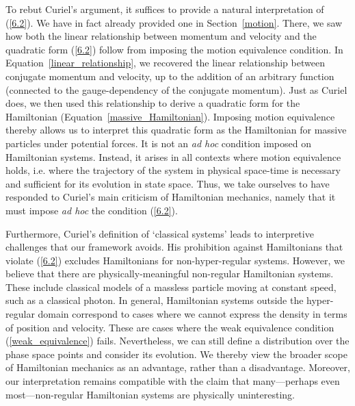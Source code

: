 \documentclass[12pt, english, twoside]{article} %
\begin{document}
To rebut Curiel's argument, it suffices to provide a natural interpretation of (\ref{6.2}). We have in fact already provided one in Section~\ref{motion}. There, we saw how both the linear relationship between momentum and velocity and the quadratic form (\ref{6.2}) follow from imposing the motion equivalence condition. In Equation~\ref{linear_relationship}, we recovered the linear relationship between conjugate momentum and velocity, up to the addition of an arbitrary function (connected to the gauge-dependency of the conjugate momentum). Just as Curiel does, we then used this relationship to derive a quadratic form for the Hamiltonian (Equation~\ref{massive_Hamiltonian}). Imposing motion equivalence thereby allows us to interpret this quadratic form as the Hamiltonian for massive particles under potential forces. It is not an \textit{ad hoc} condition imposed on Hamiltonian systems. Instead, it arises in all contexts where motion equivalence holds, i.e. where the trajectory of the system in physical space-time is necessary and sufficient for its evolution in state space. Thus, we take ourselves to have responded to Curiel's main criticism of Hamiltonian mechanics, namely that it must impose \textit{ad hoc} the condition (\ref{6.2}). 

Furthermore, Curiel's definition of `classical systems' leads to interpretive challenges that our framework avoids. His prohibition against Hamiltonians that violate (\ref{6.2}) excludes Hamiltonians for non-hyper-regular systems. However, we believe that there are physically-meaningful non-regular Hamiltonian systems. These include classical models of a massless particle moving at constant speed, such as a classical photon. In general, Hamiltonian systems outside the hyper-regular domain correspond to cases where we cannot express the density in terms of position and velocity. These are cases where the weak equivalence condition (\ref{weak_equivalence}) fails. Nevertheless, we can still define a distribution over the phase space points and consider its evolution. We thereby view the broader scope of Hamiltonian mechanics as an advantage, rather than a disadvantage. Moreover, our interpretation remains compatible with the claim that many---perhaps even most---non-regular Hamiltonian systems are physically uninteresting.
\end{document}
